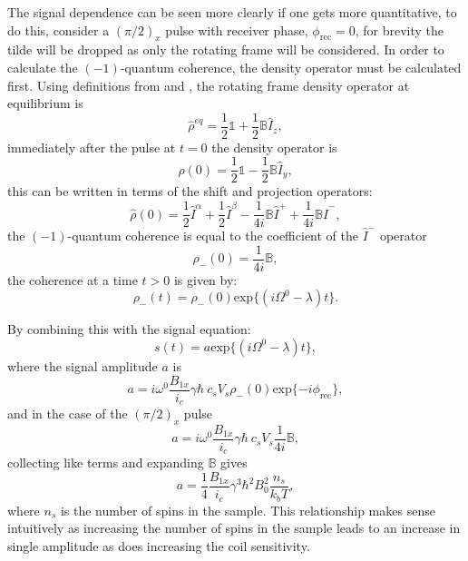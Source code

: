 The signal dependence can be seen more clearly if one gets more quantitative, to do this,
consider a $(\pi/2)_x$ pulse with receiver phase, $\phi_{\text{rec}} = 0$, for brevity the
tilde will be dropped as only the rotating frame will be considered. In order to calculate the $(-1)$-quantum coherence,
the density operator must be calculated first. Using definitions from 
and , the rotating frame density operator at equilibrium is
\begin{equation}
  \hat{\rho}^{eq} = \frac{1}{2}\mathbb{1} + \frac{1}{2}\mathbb{B}\hat{I}_z,
\end{equation}
immediately after the pulse at $t=0$ the density operator is
\begin{equation}
  \hat{\rho}(0) = \frac{1}{2}\mathbb{1} - \frac{1}{2}\mathbb{B}\hat{I}_y,
\end{equation}
this can be written in terms of the shift and projection operators:
\begin{equation}
  \hat{\rho}(0) = \frac{1}{2}\hat{I}^{\alpha} + \frac{1}{2}\hat{I}^{\beta} - \frac{1}{4i}\mathbb{B}\hat{I}^+ + \frac{1}{4i}\mathbb{B}\hat{I}^-,
\end{equation}
the $(-1)$-quantum coherence is equal to the coefficient of the $\hat{I}^-$ operator
\begin{equation}
  \rho_-(0) = \frac{1}{4i}\mathbb{B},
\end{equation}
the coherence at a time $t>0$ is given by:
\begin{equation}
  \rho_-(t) = \rho_-(0)\text{exp}\{(i\Omega^0 -\lambda)t\}.
\end{equation}

By combining this with the signal equation:
\begin{equation}
  s(t) = a \text{exp}\{(i\Omega^0 -\lambda)t\},
\end{equation}
where the signal amplitude $a$ is
\begin{equation}
  a = i\omega^0\frac{B_{1x}}{i_c}\gamma\hbar~c_sV_s\rho_-(0)\text{exp}\{-i\phi_{\text{rec}}\},
\end{equation}
and in the case of the $(\pi/2)_x$ pulse
\begin{equation}
  a = i\omega^0\frac{B_{1x}}{i_c}\gamma\hbar~c_sV_s\frac{1}{4i}\mathbb{B},
\end{equation}
collecting like terms and expanding $\mathbb{B}$ gives
\begin{equation}\label{eqn:SignalAmplitude}
  a = \frac{1}{4}\frac{B_{1x}}{i_c}\gamma^3\hbar^2B_0^2\frac{n_s}{k_bT},
\end{equation}
where $n_s$ is the number of spins in the sample. This relationship makes sense intuitively
as increasing the number of spins in the sample leads to an increase in single amplitude as does increasing the
coil sensitivity.

